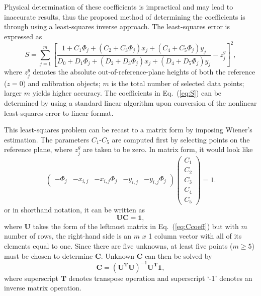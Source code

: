 Physical determination of these coefficients is impractical and may lead to inaccurate results, thus the proposed method of determining the coefficients is through using a least-squares inverse approach. The least-squares error is expressed as 
\begin{equation}
	S=\sum\limits_{j=1}^m \left[\frac{1+C_1 \Phi_j + ( C_2 + C_3 \Phi_j)x_j + ( C_4 + C_5 \Phi_j)y_j}{D_0+D_1 \Phi_j + ( D_2 + D_3 \Phi_j)x_j + ( D_4 + D_5 \Phi_j)y_j} - z^g_j\right]^2,
	\label{eq:S}
\end{equation}
where $z^g_j$ denotes the absolute out-of-reference-plane heights of both the reference ($z = 0$) and calibration objects; $m$ is the total number of selected data points; larger $m$ yields higher accuracy. The coefficients in Eq.~(\ref{eq:S}) can be determined by using a  standard linear algorithm upon conversion of the nonlinear least-squares error to linear format. 

This least-squares problem can be recast to a matrix form by imposing Wiener's estimation. The parameters $C_1$-$C_5$ are computed first by selecting points on the reference plane, where $z^g_j$ are taken to be zero. In matrix form, it would look like
\begin{equation}
	\begin{pmatrix}
		-\Phi_j & -x_{i,j} & -x_{i,j}\Phi_j & -y_{i,j} & -y_{i,j}\Phi_j
	\end{pmatrix}
	\begin{pmatrix}
		C_1\\C_2\\C_3\\C_4\\C_5
	\end{pmatrix}
	=
	1.
	\label{eq:Ccoeff}
\end{equation}
or in shorthand notation, it can be written as
\begin{equation}
	\mathbf{UC}=\mathbf{1},
	\label{eq:Ccoeffshort}
\end{equation}
where $\mathbf{U}$ takes the form of the leftmost matrix in Eq.~(\ref{eq:Ccoeff}) but with $m$ number of rows, the right-hand side is an $m$ $x$ 1 column vector with all of its elements equal to one. Since there are five unknowns, at least five points ($m\geq5$) must be chosen to determine $\mathbf{C}$. Unknown $\mathbf{C}$ can then be solved by
\begin{equation}
	\mathbf{C}=(\mathbf{U^TU})^{-1}\mathbf{U^T1},
\end{equation}
where superscript $\mathbf T$ denotes transpose operation and superscript `-1' denotes an inverse matrix operation.

